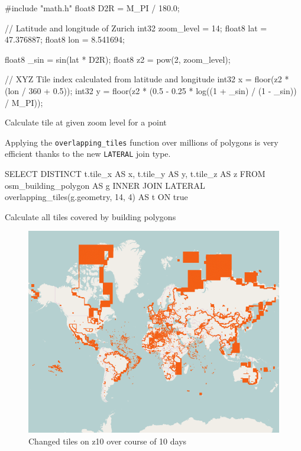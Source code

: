 \begin{listing}[H]
  \centering
  \begin{ccode}
#include "math.h"
float8 D2R = M_PI / 180.0;

// Latitude and longitude of Zurich
int32 zoom_level = 14;
float8 lat = 47.376887;
float8 lon = 8.541694;

float8 _sin = sin(lat * D2R);
float8 z2 = pow(2, zoom_level);

// XYZ Tile index calculated from latitude and longitude
int32 x = floor(z2 * (lon / 360 + 0.5));
int32 y = floor(z2 * (0.5 - 0.25 * log((1 + _sin) / (1 - _sin)) / M_PI));

  \end{ccode}
  \caption{Calculate tile at given zoom level for a point}
\end{listing}

Applying the \texttt{overlapping\_tiles} function over millions of polygons is very efficient thanks to the new \texttt{LATERAL} join type.

\begin{listing}[H]
  \centering
  \begin{sqlcode}
    SELECT DISTINCT t.tile_x AS x, t.tile_y AS y, t.tile_z AS z
    FROM osm_building_polygon AS g
    INNER JOIN LATERAL overlapping_tiles(g.geometry, 14, 4) AS t ON true
  \end{sqlcode}
  \caption{Calculate all tiles covered by building polygons}
\end{listing}

\begin{figure}[H]
  \centering
  \includegraphics[width=1\textwidth]{images/changed_tiles_z10.png}
  \caption{Changed tiles on z10 over course of 10 days}
\end{figure}
